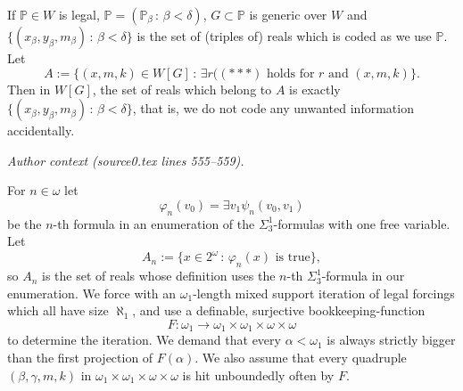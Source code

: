 \documentclass[10pt,a4paper]{amsart}
\newcommand{\forceP}{\mathbb{P}}
\begin{document}
\begin{lemma}
If $\forceP \in W$ is legal, $\forceP=(\forceP_{\beta} \, : \, \beta < \delta)$, $G \subset \forceP$ is generic over $W$ and $\{ (x_{\beta},y_{\beta},m_{\beta} ) \, : \, \beta < \delta\}$ is the set of (triples of) reals which is coded as we use $\forceP$. Let 
\[A:= \{ (x,m,k) \in W[G] \, : \, \exists r ( ({\ast}{\ast}{\ast} )\text{ holds for $r$ and $(x,m,k)$} \}.  \] Then
in $W[G]$, the set of reals which belong to $A$ is exactly 
$\{ (x_{\beta},y_{\beta},m_{\beta} ) \, : \, \beta < \delta\}$, that is, we do not code any unwanted information accidentally.
\end{lemma}
\par\medskip\noindent\textit{Author context (source0.tex lines 555--559).}\par\smallskip
For $n \in \omega$ let \[\varphi_n(v_0)= \exists v_1 \psi_n(v_0,v_1)\]  be the $n$-th formula in an enumeration of the $\Sigma^1_3$-formulas with one free variable. Let \[A_n:= \{ x \in 2^{\omega} \, : \, \varphi_n(x) \text{ is true} \},\] so $A_n$ is the set of reals whose definition uses the $n$-th $\Sigma^1_3$-formula in our enumeration. We force with an $\omega_1$-length
mixed support iteration of legal forcings which all have size $\aleph_1$, and use 
a definable, surjective bookkeeping-function \[ F: \omega_1 \rightarrow \omega_1  \times \omega_1 \times \omega \times \omega\]  to determine the iteration. We demand that every $\alpha < \omega_1$ is always strictly bigger than the first projection of $F(\alpha)$. We also assume that every quadruple $(\beta, \gamma, m,k)$ in $\omega_1  \times \omega_1 \times \omega \times \omega$ is hit unboundedly often by $F$.
\end{document}
